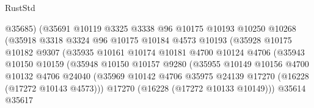 \begin{lexlean}{RustStd}
\begin{coremodule}
                                  @35685)
                                (@35691
                                  @10119
                                  @3325
                                  @3338
                                  @96
                                  @10175
                                  @10193
                                  @10250
                                  @10268
                                  (@35918
                                    @3318
                                    @3324
                                    @96
                                    @10175
                                    @10184
                                    @4573
                                    @10193
                                    (@35928
                                      @10175
                                      @10182
                                      @9307
                                      (@35935
                                        @10161
                                        @10174
                                        @10181
                                        @4700
                                        @10124
                                        @4706
                                        (@35943
                                          @10150
                                          @10159
                                          (@35948
                                            @10150
                                            @10157
                                            @9280
                                            (@35955
                                              @10149
                                              @10156
                                              @4700
                                              @10132
                                              @4706
                                              @24040
                                              (@35969
                                                @10142
                                                @4706
                                                @35975
                                                @24139
                                                @17270
                                                (@16228 (@17272 @10143 @4573)))
                                              @17270
                                              (@16228 (@17272 @10133 @10149)))
                                            @35614
                                            @35617

\end{coremodule}
\end{lexlean}
